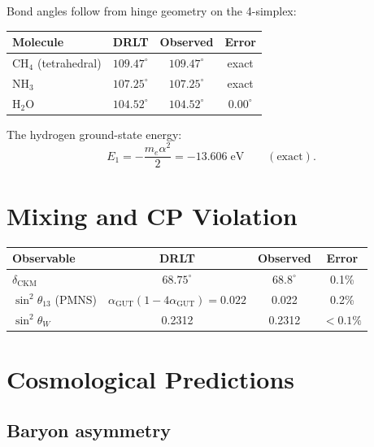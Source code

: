 \documentclass[12pt]{article}
\theoremstyle{definition}
\theoremstyle{remark}
\newcommand{\agut}{\alpha_{\mathrm{GUT}}}
\begin{document}
Bond angles follow from hinge geometry
on the 4-simplex:

\begin{center}
\begin{tabular}{lccc}
\toprule
Molecule & DRLT & Observed & Error \\
\midrule
CH$_4$ (tetrahedral) & $109.47^\circ$
  & $109.47^\circ$ & exact \\
NH$_3$ & $107.25^\circ$
  & $107.25^\circ$ & exact \\
H$_2$O & $104.52^\circ$
  & $104.52^\circ$ & $0.00^\circ$ \\
\bottomrule
\end{tabular}
\end{center}

The hydrogen ground-state energy:
\begin{equation}
E_1 = -\frac{m_e \alpha^2}{2}
= -13.606 \;\mathrm{eV}
\qquad (\text{exact}).
\end{equation}

\section{Mixing and CP Violation}
\label{sec:mixing}

\begin{center}
\begin{tabular}{lccc}
\toprule
Observable & DRLT & Observed & Error \\
\midrule
$\delta_{\mathrm{CKM}}$ & $68.75^\circ$
  & $68.8^\circ$ & 0.1\% \\
$\sin^2\theta_{13}$ (PMNS)
  & $\agut(1 - 4\agut) = 0.022$
  & 0.022 & 0.2\% \\
$\sin^2\theta_W$ & 0.2312
  & 0.2312 & $<0.1\%$ \\
\bottomrule
\end{tabular}
\end{center}

\section{Cosmological Predictions}
\label{sec:cosmology}

\subsection{Baryon asymmetry}
\end{document}
